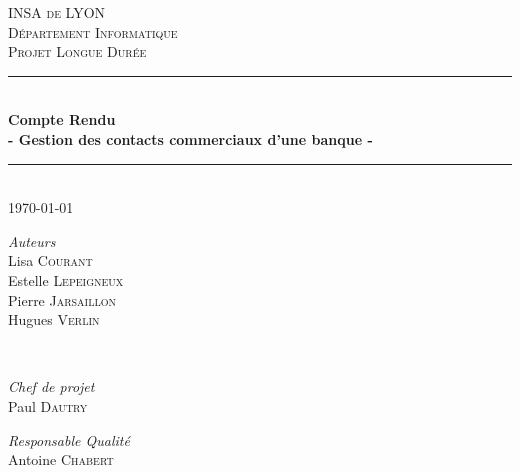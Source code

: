 \documentclass[12pt]{article}
\begin{document}
\begin{titlepage}

\newcommand{\HRule}{\rule{\linewidth}{0.5mm}} %

\center %
 

\vspace*{1cm}

\textsc{\LARGE INSA de LYON}\\[1.5cm] 
\textsc{\Large D\'epartement Informatique}\\[0.5cm] 
\textsc{\large Projet Longue Durée}\\[0.5cm] %


\HRule \\[0.4cm]
{ \huge \bfseries Compte Rendu}\\[0.1cm]
{\large \bfseries - Gestion des contacts commerciaux d'une banque -} 
\HRule \\[1.5cm]
 

{\large \today}\\[2cm] %
 

\begin{minipage}{0.4\textwidth}
\begin{center} \large
\emph{Auteurs} \\
Lisa \textsc{Courant} \\
Estelle \textsc{Lepeigneux} \\
Pierre \textsc{Jarsaillon} \\
Hugues \textsc{Verlin} \\
\end{center}
\end{minipage}
~
\begin{minipage}{0.4\textwidth}
\begin{center} \large
\emph{Chef de projet} \\
Paul \textsc{Dautry}
\end{center}
\begin{center} \large
\emph{Responsable Qualité} \\
Antoine \textsc{Chabert}
\end{center}
\end{minipage}\\[5cm]


\end{titlepage}
\end{document}
